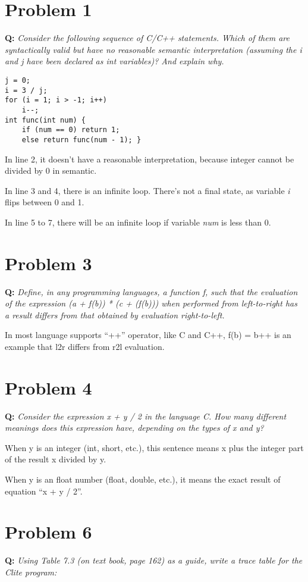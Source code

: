 \documentclass{article}
\begin{document}
\section*{Problem 1}
\textbf{Q:} \textit{Consider the following sequence of C/C++ statements. Which of them are syntactically valid but have no reasonable semantic interpretation (assuming the i and j have been declared as int variables)? And explain why.}

\begin{lstlisting}
j = 0;
i = 3 / j;
for (i = 1; i > -1; i++)
    i--;
int func(int num) {
    if (num == 0) return 1;
    else return func(num - 1); }
\end{lstlisting}

In line 2, it doesn't have a reasonable interpretation, because integer cannot be divided by 0 in semantic.

In line 3 and 4, there is an infinite loop. There's not a final state, as variable \textit{i} flips between 0 and 1.

In line 5 to 7, there will be an infinite loop if variable \textit{num} is less than 0.

\section*{Problem 3}
\textbf{Q:} \textit{Define, in any programming languages, a function f, such that the evaluation of the expression (a + f(b)) * (c + (f(b))) when performed from left-to-right has a result differs from that obtained by evaluation right-to-left.}

In most language supports ``++'' operator, like C and C++, f(b) = b++ is an example that l2r differs from r2l evaluation.

\section*{Problem 4}
\textbf{Q:} \textit{Consider the expression x + y / 2 in the language C. How many different meanings does this expression have, depending on the types of x and y?}

When y is an integer (int, short, etc.), this sentence means x plus the integer part of the result x divided by y.

When y is an float number (float, double, etc.), it means the exact result of equation ``x + y / 2''.

\section*{Problem 6}
\textbf{Q:} \textit{Using Table 7.3 (on text book, page 162) as a guide, write a trace table for the Clite program:}
\end{document}
